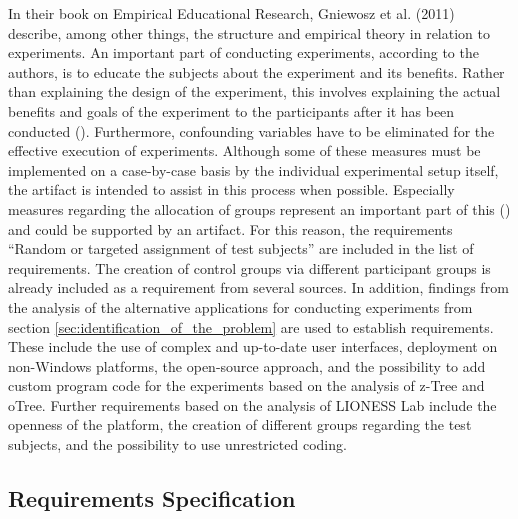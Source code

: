 In their book on Empirical Educational Research, Gniewosz et al. (2011) describe, among other things, the structure and empirical theory in relation to experiments. An important part of conducting experiments, according to the authors, is to educate the subjects about the experiment and its benefits. Rather than explaining the design of the experiment, this involves explaining the actual benefits and goals of the experiment to the participants after it has been conducted (\cite{Gniewosz.2011}). Furthermore, confounding variables have to be eliminated for the effective execution of experiments. Although some of these measures must be implemented on a case-by-case basis by the individual experimental setup itself, the artifact is intended to assist in this process when possible. Especially measures regarding the allocation of groups represent an important part of this (\cite{Gniewosz.2011}) and could be supported by an artifact. For this reason, the requirements \enquote{Random or targeted assignment of test subjects} are included in the list of requirements. The creation of control groups via different participant groups is already included as a requirement from several sources. In addition, findings from the analysis of the alternative applications for conducting experiments from section \ref{sec:identification_of_the_problem} are used to establish requirements. These include the use of complex and up-to-date user interfaces, deployment on non-Windows platforms, the open-source approach, and the possibility to add custom program code for the experiments based on the analysis of z-Tree and oTree. Further requirements based on the analysis of LIONESS Lab include the openness of the platform, the creation of different groups regarding the test subjects, and the possibility to use unrestricted coding.

\subsection{Requirements Specification}\label{subsec:reqSpec}

